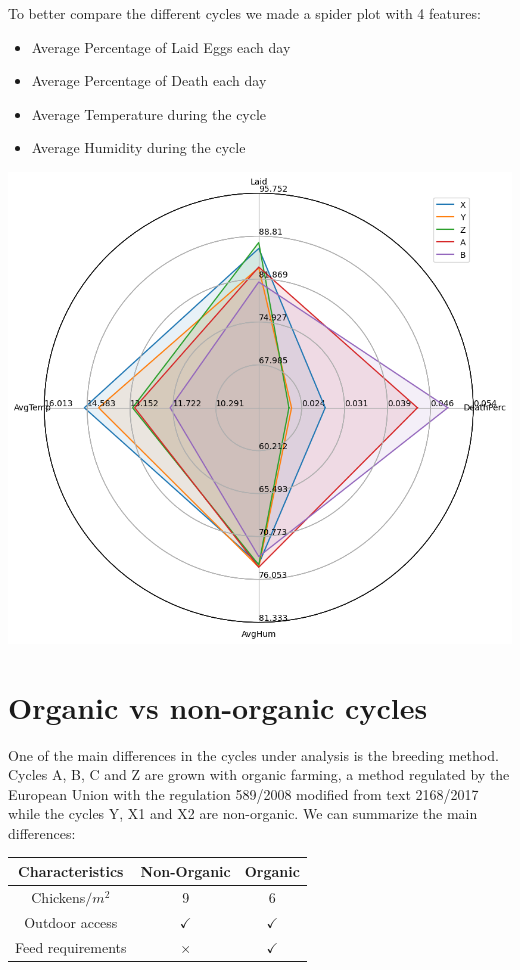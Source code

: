 \documentclass[11pt]{article}
\begin{document}
To better compare the different cycles we made a spider plot with 4 features:
\begin{itemize}
    \item Average Percentage of Laid Eggs each day
    \item Average Percentage of Death each day
    \item Average Temperature during the cycle
    \item Average Humidity during the cycle
\end{itemize}
\includegraphics[width=\linewidth]{../Results/Every_cycle/Spider_Plot.png}

\section{Organic vs non-organic cycles}
One of the main differences in the cycles under analysis is the breeding method. Cycles A, B, C and Z are grown with organic farming, a method regulated by the European Union with the regulation 589/2008
modified from text 2168/2017 %
while the cycles Y, X1 and X2 are non-organic.
We can summarize the main differences:

\begin{center}
    \begin{tabular}{| c | c | c |}
        \hline
        Characteristics  & Non-Organic      & Organic  \\ [0.5ex]
        \hline
        Chickens$/m^{2}$  & 9            & 6           \\
        \hline
        Outdoor access    & $\checkmark$ & $\checkmark$ \\
        \hline
        Feed requirements &  $\times$  & $\checkmark$   \\
        \hline
    \end{tabular}
\end{center}
\end{document}
